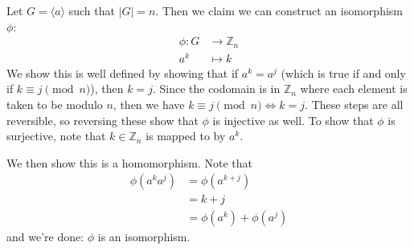 \begin{sol}
    Let $G=\langle a\rangle$ such that $|G|=n$. Then we claim we can construct an isomorphism $\phi$:
    \begin{align*}
        \phi: G &\rightarrow \mathbb{Z}_n \\ 
        a^k &\mapsto k
    \end{align*}
    We show this is well defined by showing that if $a^k=a^j$ (which is true if and only if $k\equiv j \pmod{n}$), then $k=j$. Since the codomain is in $\mathbb{Z}_n$ where each element is taken to be modulo $n$, then we have $k\equiv j \pmod{n} \iff k=j$. These steps are all reversible, so reversing these show that $\phi$ is injective as well. To show that $\phi$ is surjective, note that $k \in \mathbb{Z}_n$ is mapped to by $a^k$.
    \vspace{2mm}

    We then show this is a homomorphism. Note that
    \begin{align*}
        \phi(a^ka^j)&=\phi(a^{k+j}) \\ 
        &= k + j \\ 
        &= \phi(a^k) + \phi(a^j)
    \end{align*}
    and we're done: $\phi$ is an isomorphism.
\end{sol}
